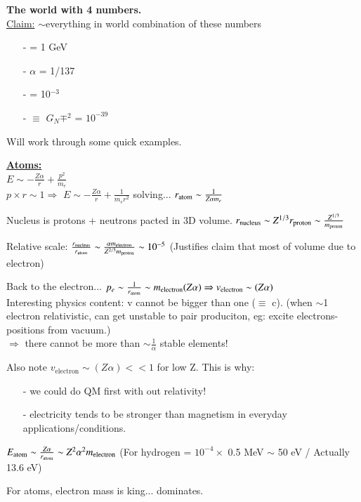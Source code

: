 {\textbf{The world with 4 numbers.}\\
\underline{Claim:} $\sim$everything in world combination of these numbers\\
\begin{itemize}
\item[-]\mp = 1 GeV 
\item[-]$\alpha$ = 1/137
\item[-]\me = 10$^{-3}$ \GeV
\item[-]\aG $\equiv$ $G_N \mp^2$ = $10^{-39}$
\end{itemize}

Will work through some quick examples.

\underline{\textbf{Atoms:}}\\
$E\sim - \frac{Z\alpha}{r} + \frac{p^2}{m_e}$\\
$p\times r \sim 1 \Rightarrow$ $E\sim - \frac{Z\alpha}{r} + \frac{1}{m_e r^2}$ solving... $r_{\textrm{atom}} \sim \frac{1}{Z\alpha m_e}$

Nucleus is protons + neutrons pacted in 3D volume. 
$r_{\textrm{nucleus}} \sim Z^{1/3}r_{\textrm{proton}} \sim \frac{Z^{1/3}}{m_{\textrm{proton}}}$ 

Relative scale: 
$\frac{r_{\textrm{nucleus}}}{r_{\textrm{atom}}} \sim \frac{\alpha m_{\textrm{electron}}}{Z^{2/3}m_{\textrm{proton}}} \sim 10^{-5}$  (Justifies claim that most of volume due to electron)

Back to the electron...
$p_e \sim \frac{1}{r_{\textrm{atom}}} \sim m_{\textrm{electron}} (Z\alpha)  \Rightarrow  v_{\textrm{electron}} \sim (Z\alpha)$\\
Interesting physics content: 
v cannot be bigger than one ($\equiv$ c).  (when $\sim$1 electron relativistic, can get unstable to pair produciton, eg: excite electrons-positions from vacuum.)\\
$\Rightarrow$ there cannot be more than $\sim \frac{1}{\alpha}$ stable elements!

Also note $v_{\textrm{electron}} \sim (Z\alpha) << 1$ for low Z.
This is why:
\begin{itemize}
\item[-] we could do QM first with out relativity!
\item[-] electricity tends to be stronger than magnetism in everyday applications/conditions.
\end{itemize}


$E_{\textrm{atom}} \sim \frac{Z\alpha}{r_{\textrm{atom}}} \sim Z^2\alpha^2m_{\textrm{electron}}$
(For hydrogen = $10^{-4} \times$ 0.5 MeV $\sim$ 50 eV  / Actually 13.6 eV)

For atoms,  electron mass is king... dominates.

}
